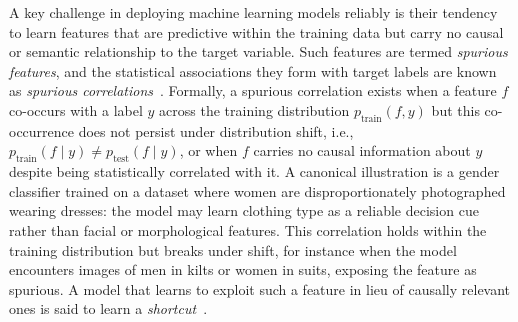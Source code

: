 
A key challenge in deploying machine learning models reliably is their tendency to learn
features that are predictive within the training data but carry no causal or semantic
relationship to the target variable. Such features are termed \emph{spurious features}, and
the statistical associations they form with target labels are known as \emph{spurious correlations}~\cite{Arjovsky_2020_InvariantRiskMinimization,Sagawa_2020_DistributionallyRobustNeuralNetworksForGroupShifts}. Formally, a spurious correlation exists when a feature $f$ co-occurs with a label $y$ across the training distribution $p_{\text{train}}(f, y)$ but this co-occurrence does not persist under distribution shift, i.e., $p_{\text{train}}(f \mid y) \neq p_{\text{test}}(f \mid y)$, or
when $f$ carries no causal information about $y$ despite being statistically correlated with
it. A canonical illustration is a gender classifier trained on a dataset where women are
disproportionately photographed wearing dresses: the model may learn clothing type as a
reliable decision cue rather than facial or morphological features. This correlation holds
within the training distribution but breaks under shift, for instance when the model
encounters images of men in kilts or women in suits, exposing the feature as spurious. A
model that learns to exploit such a feature in lieu of causally relevant ones is said to
learn a \emph{shortcut}~\cite{Geirhos_2020_ShortcutLearningInDeepNeuralNetworks}.

